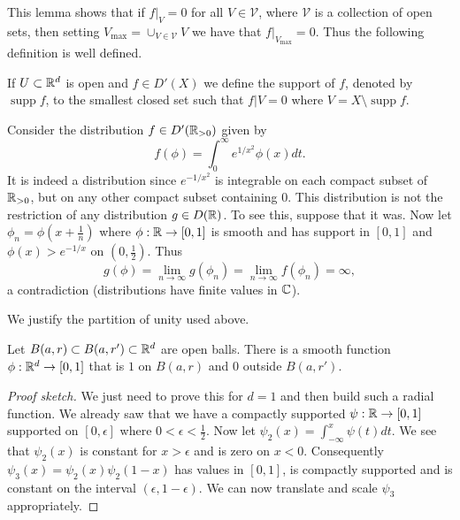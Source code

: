 \documentclass[twoside, a4paper, 10pt]{amsart}
\begin{document}
This lemma shows that if $f|_V = 0$ for all $V \in \mathcal{V}$, where $\mathcal{V}$ is a collection of open sets, then setting $V_{\max} = \cup_{V \in \mathcal{V}} V$ we have that $f|_{V_{\max}} = 0$. Thus the following definition is well defined.

\begin{mydef} If $U \subset \mathbb{R}^d$ is open and $f \in D'(X)$ we define the support of $f$, denoted by $\operatorname{supp} f$, to the smallest closed set such that $f|V = 0$ where $V = X \setminus \operatorname{supp} f$.

\end{mydef}

\begin{eg} Consider the distribution $f \in D'(\mathbb{R}_{>0})$ given by $$f(\phi) = \int_0^{\infty} e^{1/x^2} \phi(x) dt.$$ It is indeed a distribution since $e^{-1/x^2}$ is integrable on each compact subset of $\mathbb{R}_{>0}$, but on any other compact subset containing $0$. This distribution is not the restriction of any distribution $g \in D(\mathbb{R})$. To see this, suppose that it was. Now let $\phi_n = \phi(x+\frac{1}{n})$ where $\phi:\mathbb{R} \to [0,1]$ is smooth and has support in $[0,1]$ and $\phi(x) > e^{-1/x}$ on $(0,\frac{1}{2})$. Thus $$g(\phi) = \lim_{n \to \infty} g(\phi_n) = \lim_{n \to \infty} f(\phi_n) = \infty,$$ a contradiction (distributions have finite values in $\mathbb{C}$).

\end{eg}

We justify the partition of unity used above.

\begin{prop} Let $B(a,r) \subset B(a,r') \subset \mathbb{R}^d$ are open balls. There is a smooth function $\phi:\mathbb{R}^d \to [0,1]$ that is $1$ on $B(a,r)$ and $0$ outside $B(a,r')$. 

\end{prop}

\begin{proof}[Proof sketch] We just need to prove this for $d=1$ and then build such a radial function. We already saw that we have a compactly supported $\psi:\mathbb{R} \to [0,1]$ supported on $[0,\epsilon]$ where $0<\epsilon<\frac{1}{2}$. Now let $\psi_2(x) = \int_{-\infty}^x \psi(t) dt$. We see that $\psi_2(x)$ is constant for $x>\epsilon$ and is zero on $x<0$. Consequently $\psi_3(x) = \psi_2(x) \psi_2(1-x)$ has values in $[0,1]$, is compactly supported and is constant on the interval $(\epsilon, 1 - \epsilon)$. We can now translate and scale $\psi_3$ appropriately. \end{proof}
\end{document}
